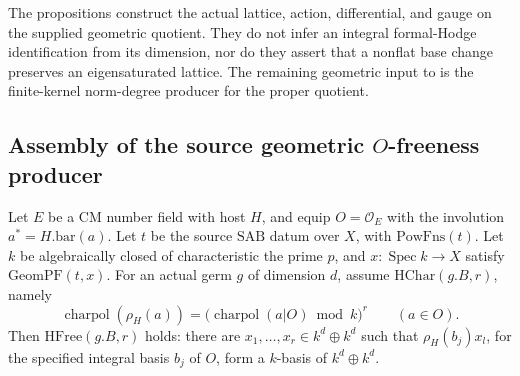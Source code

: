 The propositions construct the actual lattice, action,
differential, and gauge on the supplied geometric quotient.
They do not infer an integral formal-Hodge identification
from its dimension, nor do they assert that a nonflat
base change preserves an eigensaturated lattice.
The remaining geometric input to
 is the finite-kernel
norm-degree producer for the proper quotient.


\subsection{Assembly of the source geometric \(O\)-freeness producer}
\label{subsec:faithful-geometric-hfree-assembly}

\begin{srtheorem}
\label{thm:faithful-geometric-hfree}
Let \(E\) be a CM number field with host \(H\), and equip
\(O=\mathcal O_E\) with the involution \(a^*=H.\mathrm{bar}(a)\).
Let \(t\) be the source \(\mathrm{SAB}\) datum over \(X\), with
\(\mathrm{PowFns}(t)\).
Let \(k\) be algebraically closed of characteristic the
prime \(p\), and \(x:\operatorname{Spec}k\to X\) satisfy
\(\mathrm{GeomPF}(t,x)\).
For an actual germ \(g\) of dimension \(d\), assume
\(\mathrm{HChar}(g.B,r)\), namely
\[
 \operatorname{charpol}(\rho_H(a))
   =\bigl(\operatorname{charpol}(a|O)\bmod k\bigr)^r
                            \qquad(a\in O).
 \tag{HF1}\label{eq:faithful-hfree-character}
\]
Then \(\mathrm{HFree}(g.B,r)\) holds:
there are \(x_1,\ldots,x_r\in k^d\oplus k^d\) such that
\(\rho_H(b_j)x_l\), for the specified integral basis \(b_j\)
of \(O\), form a \(k\)-basis of \(k^d\oplus k^d\).
\end{srtheorem}

